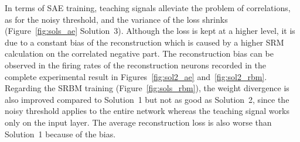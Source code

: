 In terms of SAE training, teaching signals  alleviate the problem of correlations, as for the noisy threshold, and the variance of the loss shrinks (Figure~\ref{fig:sols_ae} Solution~3).
Although the loss is kept at a higher level, it is due to a constant bias of the reconstruction which is caused by a higher SRM calculation on the correlated negative part.
The reconstruction bias can be observed in the firing rates of the reconstruction neurons recorded in the complete experimental result in Figures~\ref{fig:sol2_ae} and~\ref{fig:sol2_rbm}.
Regarding the SRBM training (Figure~\ref{fig:sols_rbm}), the weight divergence is also improved compared to Solution~1 but not as good as Solution~2, since the noisy threshold applies to the entire network whereas the teaching signal works only on the input layer.
The average reconstruction loss is also worse than Solution~1 because of the bias. 

